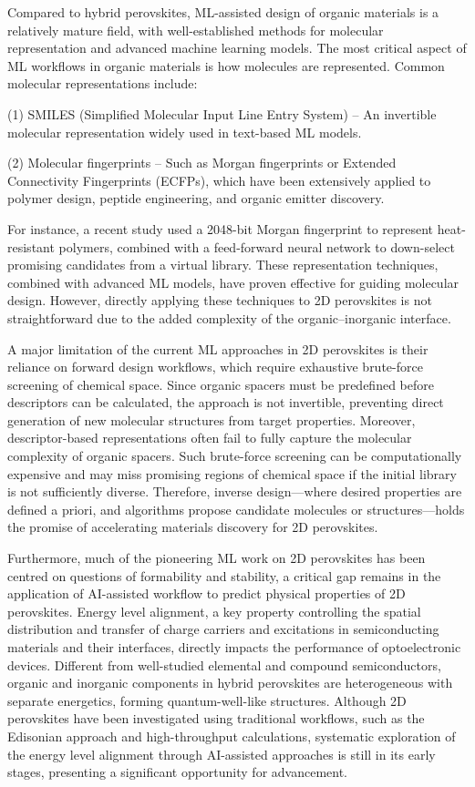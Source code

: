 Compared to hybrid perovskites, ML-assisted design of organic materials is a relatively mature field, with well-established methods for molecular representation and advanced machine learning models\cite{RN612,RN563,RN610,RN564}. The most critical aspect of ML workflows in organic materials is how molecules are represented. Common molecular representations include: 

(1) SMILES (Simplified Molecular Input Line Entry System) – An invertible molecular representation widely used in text-based ML models. 

(2) Molecular fingerprints – Such as Morgan fingerprints or Extended Connectivity Fingerprints (ECFPs), which have been extensively applied to polymer design, peptide engineering, and organic emitter discovery. 

For instance, a recent study used a 2048-bit Morgan fingerprint to represent heat-resistant polymers, combined with a feed-forward neural network to down-select promising candidates from a virtual library\cite{RN610}. These representation techniques, combined with advanced ML models, have proven effective for guiding molecular design. However, directly applying these techniques to 2D perovskites is not straightforward due to the added complexity of the organic–inorganic interface.

A major limitation of the current ML approaches in 2D perovskites is their reliance on forward design workflows, which require exhaustive brute-force screening of chemical space. Since organic spacers must be predefined before descriptors can be calculated, the approach is not invertible, preventing direct generation of new molecular structures from target properties. Moreover, descriptor-based representations often fail to fully capture the molecular complexity of organic spacers. Such brute-force screening can be computationally expensive and may miss promising regions of chemical space if the initial library is not sufficiently diverse. Therefore, inverse design—where desired properties are defined a priori, and algorithms propose candidate molecules or structures—holds the promise of accelerating materials discovery for 2D perovskites. 

Furthermore, much of the pioneering ML work on 2D perovskites has been centred on questions of formability and stability, a critical gap remains in the application of AI-assisted workflow to predict physical properties of 2D perovskites. Energy level alignment, a key property controlling the spatial distribution and transfer of charge carriers and excitations in semiconducting materials and their interfaces, directly impacts the performance of optoelectronic devices. Different from well-studied elemental and compound semiconductors, organic and inorganic components in hybrid perovskites are heterogeneous with separate energetics, forming quantum-well-like structures\cite{RN18}. Although 2D perovskites have been investigated using traditional workflows, such as the Edisonian approach\cite{RN20} and high-throughput calculations\cite{RN236,RN617}, systematic exploration of the energy level alignment through AI-assisted approaches is still in its early stages\cite{RN618}, presenting a significant opportunity for advancement. 

